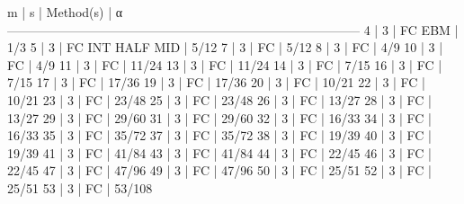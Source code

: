   m    |   s    |                   Method(s)                  |        α        
------------------------------------------------------------------------------------   
4     |  3     |    FC             EBM                        | 1/3   
5     |  3     |    FC  INT  HALF            MID              | 5/12   
7     |  3     |    FC                                        | 5/12   
8     |  3     |    FC                                        | 4/9   
10    |  3     |    FC                                        | 4/9   
11    |  3     |    FC                                        | 11/24   
13    |  3     |    FC                                        | 11/24   
14    |  3     |    FC                                        | 7/15   
16    |  3     |    FC                                        | 7/15   
17    |  3     |    FC                                        | 17/36   
19    |  3     |    FC                                        | 17/36   
20    |  3     |    FC                                        | 10/21   
22    |  3     |    FC                                        | 10/21   
23    |  3     |    FC                                        | 23/48   
25    |  3     |    FC                                        | 23/48   
26    |  3     |    FC                                        | 13/27   
28    |  3     |    FC                                        | 13/27   
29    |  3     |    FC                                        | 29/60   
31    |  3     |    FC                                        | 29/60   
32    |  3     |    FC                                        | 16/33   
34    |  3     |    FC                                        | 16/33   
35    |  3     |    FC                                        | 35/72   
37    |  3     |    FC                                        | 35/72   
38    |  3     |    FC                                        | 19/39   
40    |  3     |    FC                                        | 19/39   
41    |  3     |    FC                                        | 41/84   
43    |  3     |    FC                                        | 41/84   
44    |  3     |    FC                                        | 22/45   
46    |  3     |    FC                                        | 22/45   
47    |  3     |    FC                                        | 47/96   
49    |  3     |    FC                                        | 47/96   
50    |  3     |    FC                                        | 25/51   
52    |  3     |    FC                                        | 25/51   
53    |  3     |    FC                                        | 53/108   
